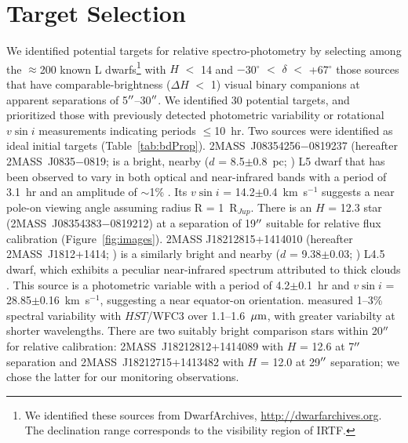\documentclass[twocolumn]{aastex6}
\newcommand{\degree}{$^\circ$}
\newcommand{\kms}{km~s$^{-1}$}
\newcommand{\rjup}{R$_{Jup}$}
\newcommand{\sha}{2MASS~J0835$-$0819}
\newcommand{\shb}{2MASS~J1812+1414}
\begin{document}
\section{Target Selection}\label{sec:targets}

We identified potential targets for relative spectro-photometry by selecting among the $\approx$200 known L dwarfs\footnote{We identified these sources from DwarfArchives,  \url{http://dwarfarchives.org}. The declination range corresponds to the visibility region of IRTF.} with $H$ $<$ 14 and $-$30{\degree}  $<$ $\delta$ $<$ +67{\degree} those sources that have comparable-brightness ($\Delta{H}$ $<$ 1) visual binary companions at apparent separations of 5$\mbox{$^{\prime\prime}$}$--30$\mbox{$^{\prime\prime}$}$. We identified 30 potential targets, and prioritized those with previously detected photometric variability or rotational $v\sin{i}$ measurements indicating periods $\leq$10~hr.  Two sources were identified as ideal initial targets (Table~\ref{tab:bdProp}).
2MASS~J08354256$-$0819237 (hereafter {\sha}; \citealt{2003AJ....126.2421C} is a bright, nearby ($d$ = 8.5$\pm$0.8~pc; \citealt{2012ApJ...752...56F}) L5 dwarf that has been observed to vary in both optical and near-infrared bands with a period of 3.1~hr and an amplitude of $\sim$1\%  \citep{2004MNRAS.354..378K,2014A&A...566A.111W}. Its $v\sin{i}$ = 14.2$\pm$0.4~{\kms} \citep{2010ApJ...723..684B} suggests a near pole-on viewing angle assuming radius R = 1~{\rjup}. There is an $H$ = 12.3 star (2MASS~J08354383$-$0819212) at a separation of 19$\mbox{$^{\prime\prime}$}$ suitable for relative flux calibration (Figure~\ref{fig:images}). 
2MASS J18212815+1414010 (hereafter {\shb}; \citealt{2008ApJ...686..528L}) is a similarly bright and nearby ($d$ = 9.38$\pm$0.03; \citealt{2016MNRAS.455..357S}) L4.5 dwarf, which exhibits a peculiar near-infrared spectrum attributed to thick clouds \citep{2008ApJ...686..528L,2015ApJS..219...33G}. This source is a photometric variable with a period of 4.2$\pm$0.1~hr \citep{2015ApJ...799..154M} and $v\sin{i}$ = 28.85$\pm$0.16~{\kms}, suggesting a near equator-on orientation.  \citet{2015ApJ...798L..13Y} measured 1--3\% spectral variability with $HST$/WFC3 over 1.1--1.6~$\mbox{$\mu$m}$, with greater variabilty at shorter wavelengths. There are two suitably bright comparison stars within 20$\mbox{$^{\prime\prime}$}$ for relative calibration: 2MASS~J18212812+1414089 with $H$ = 12.6 at 7$\mbox{$^{\prime\prime}$}$ separation and 2MASS~J18212715+1413482 with $H$ = 12.0 at 29$\mbox{$^{\prime\prime}$}$ separation; we chose the latter for our monitoring observations.
\end{document}
